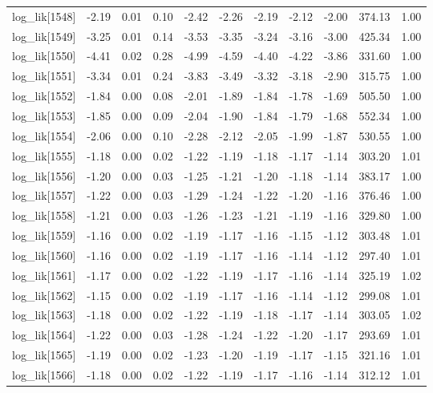 \begin{table}[ht]
\begin{tabular}{rrrrrrrrrrr}
  log\_lik[1548] & -2.19 & 0.01 & 0.10 & -2.42 & -2.26 & -2.19 & -2.12 & -2.00 & 374.13 & 1.00 \\ 
  log\_lik[1549] & -3.25 & 0.01 & 0.14 & -3.53 & -3.35 & -3.24 & -3.16 & -3.00 & 425.34 & 1.00 \\ 
  log\_lik[1550] & -4.41 & 0.02 & 0.28 & -4.99 & -4.59 & -4.40 & -4.22 & -3.86 & 331.60 & 1.00 \\ 
  log\_lik[1551] & -3.34 & 0.01 & 0.24 & -3.83 & -3.49 & -3.32 & -3.18 & -2.90 & 315.75 & 1.00 \\ 
  log\_lik[1552] & -1.84 & 0.00 & 0.08 & -2.01 & -1.89 & -1.84 & -1.78 & -1.69 & 505.50 & 1.00 \\ 
  log\_lik[1553] & -1.85 & 0.00 & 0.09 & -2.04 & -1.90 & -1.84 & -1.79 & -1.68 & 552.34 & 1.00 \\ 
  log\_lik[1554] & -2.06 & 0.00 & 0.10 & -2.28 & -2.12 & -2.05 & -1.99 & -1.87 & 530.55 & 1.00 \\ 
  log\_lik[1555] & -1.18 & 0.00 & 0.02 & -1.22 & -1.19 & -1.18 & -1.17 & -1.14 & 303.20 & 1.01 \\ 
  log\_lik[1556] & -1.20 & 0.00 & 0.03 & -1.25 & -1.21 & -1.20 & -1.18 & -1.14 & 383.17 & 1.00 \\ 
  log\_lik[1557] & -1.22 & 0.00 & 0.03 & -1.29 & -1.24 & -1.22 & -1.20 & -1.16 & 376.46 & 1.00 \\ 
  log\_lik[1558] & -1.21 & 0.00 & 0.03 & -1.26 & -1.23 & -1.21 & -1.19 & -1.16 & 329.80 & 1.00 \\ 
  log\_lik[1559] & -1.16 & 0.00 & 0.02 & -1.19 & -1.17 & -1.16 & -1.15 & -1.12 & 303.48 & 1.01 \\ 
  log\_lik[1560] & -1.16 & 0.00 & 0.02 & -1.19 & -1.17 & -1.16 & -1.14 & -1.12 & 297.40 & 1.01 \\ 
  log\_lik[1561] & -1.17 & 0.00 & 0.02 & -1.22 & -1.19 & -1.17 & -1.16 & -1.14 & 325.19 & 1.02 \\ 
  log\_lik[1562] & -1.15 & 0.00 & 0.02 & -1.19 & -1.17 & -1.16 & -1.14 & -1.12 & 299.08 & 1.01 \\ 
  log\_lik[1563] & -1.18 & 0.00 & 0.02 & -1.22 & -1.19 & -1.18 & -1.17 & -1.14 & 303.05 & 1.02 \\ 
  log\_lik[1564] & -1.22 & 0.00 & 0.03 & -1.28 & -1.24 & -1.22 & -1.20 & -1.17 & 293.69 & 1.01 \\ 
  log\_lik[1565] & -1.19 & 0.00 & 0.02 & -1.23 & -1.20 & -1.19 & -1.17 & -1.15 & 321.16 & 1.01 \\ 
  log\_lik[1566] & -1.18 & 0.00 & 0.02 & -1.22 & -1.19 & -1.17 & -1.16 & -1.14 & 312.12 & 1.01 \\ 

\end{tabular}
\end{table}
